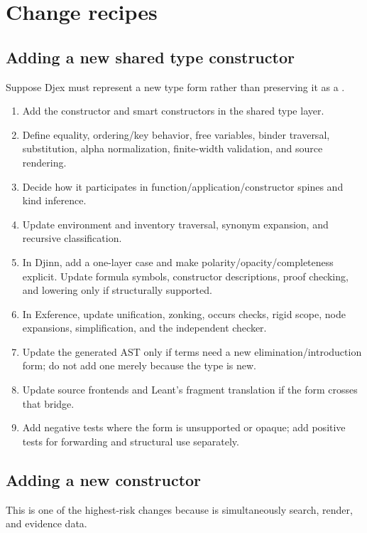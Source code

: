 \documentclass[10pt,letterpaper,oneside]{report}
\newcommand{\code}[1]{\texttt{\detokenize{#1}}}
\begin{document}
\chapter{Change recipes}\label{app:change-recipes}

\section{Adding a new shared type constructor}

Suppose Djex must represent a new type form rather than preserving it as a \code{TypeAtom}.

\begin{enumerate}
  \item Add the constructor and smart constructors in the shared type layer.
  \item Define equality, ordering/key behavior, free variables, binder traversal, substitution, alpha normalization, finite-width validation, and source rendering.
  \item Decide how it participates in function/application/constructor spines and kind inference.
  \item Update environment and inventory traversal, synonym expansion, and recursive classification.
  \item In Djinn, add a one-layer \code{TypeView} case and make polarity/opacity/completeness explicit. Update formula symbols, constructor descriptions, proof checking, and lowering only if structurally supported.
  \item In Exference, update unification, zonking, occurs checks, rigid scope, node expansions, simplification, and the independent checker.
  \item Update the generated AST only if terms need a new elimination/introduction form; do not add one merely because the type is new.
  \item Update source frontends and Leant's fragment translation if the form crosses that bridge.
  \item Add negative tests where the form is unsupported or opaque; add positive tests for forwarding and structural use separately.
\end{enumerate}

\section{Adding a new \code{Frag} constructor}

This is one of the highest-risk changes because \code{Frag} is simultaneously search, render, and evidence data.
\end{document}
